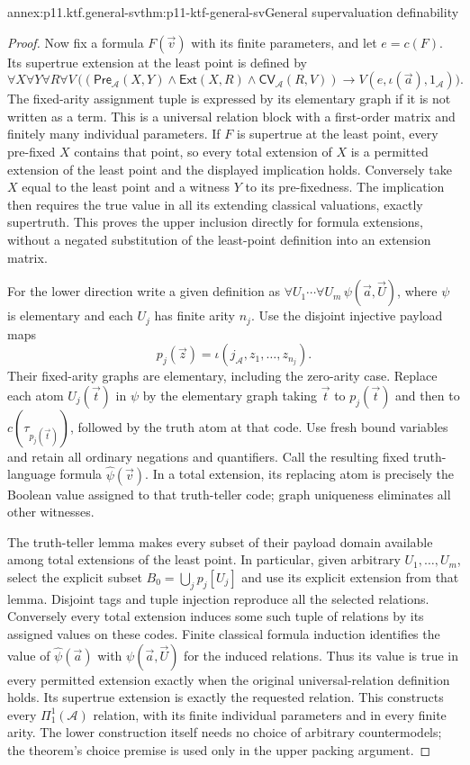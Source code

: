 \begin{annexitem}{annex:p11.ktf.general-sv}{thm:p11-ktf-general-sv}{General supervaluation definability}
\begin{proof}
Now fix a formula \(F(\vec v)\) with its finite parameters,
and let \(e=c(F)\). Its supertrue extension at the least
point is defined by
\[
 \forall X\forall Y\forall R\forall V\,
 \bigl((\mathsf{Pre}_{\mathcal A}(X,Y)
       \land\mathsf{Ext}(X,R)
       \land\mathsf{CV}_{\mathcal A}(R,V))
       \longrightarrow V(e,\iota(\vec a),1_{\mathcal A})\bigr).
\]
The fixed-arity assignment tuple is expressed by its elementary
graph if it is not written as a term. This is a universal relation
block with a first-order matrix and finitely many individual
parameters. If \(F\) is supertrue at the least point, every
pre-fixed \(X\) contains that point, so every total extension
of \(X\) is a permitted extension of the least point and
the displayed implication holds. Conversely take \(X\) equal
to the least point and a witness \(Y\) to its pre-fixedness.
The implication then requires the true value in all its extending
classical valuations, exactly supertruth. This proves the upper
inclusion directly for formula extensions, without a negated
substitution of the least-point definition into an extension matrix.

For the lower direction write a given definition as
\(\forall U_1\cdots\forall U_m\,\psi(\vec a,\vec U)\),
where \(\psi\) is elementary and each \(U_j\) has finite
arity \(n_j\). Use the disjoint injective payload maps
\[
 p_j(\vec z)=\iota(j_{\mathcal A},z_1,\ldots,z_{n_j}).
\]
Their fixed-arity graphs are elementary, including the zero-arity
case. Replace each atom \(U_j(\vec t)\) in \(\psi\)
by the elementary graph taking \(\vec t\) to \(p_j(\vec t)\)
and then to \(c(\tau_{p_j(\vec t)})\), followed by
the truth atom at that code. Use fresh bound variables and retain
all ordinary negations and quantifiers. Call the resulting fixed
truth-language formula \(\widehat\psi(\vec v)\).
In a total extension, its replacing atom is precisely the Boolean
value assigned to that truth-teller code; graph uniqueness eliminates
all other witnesses.

The truth-teller lemma makes every subset of their payload domain
available among total extensions of the least point. In particular,
given arbitrary \(U_1,\ldots,U_m\), select the explicit subset
\(B_0=\bigcup_j p_j[U_j]\) and use its explicit extension
from that lemma. Disjoint tags and tuple injection reproduce all
the selected relations. Conversely every total extension induces
some such tuple of relations by its assigned values on these
codes. Finite classical formula induction identifies the value
of \(\widehat\psi(\vec a)\) with \(\psi(\vec a,\vec U)\)
for the induced relations. Thus its value is true in every permitted
extension exactly when the original universal-relation definition
holds. Its supertrue extension is exactly the requested relation.
This constructs every \(\Pi^1_1(\mathcal A)\) relation,
with its finite individual parameters and in every finite arity.
The lower construction itself needs no choice of arbitrary
countermodels; the theorem's choice premise is used only in the
upper packing argument.
\end{proof}
\end{annexitem}

